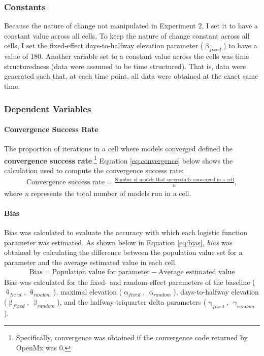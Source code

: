 \documentclass[
12pt, %
twoside,
english]{guelphthesis}
\theoremstyle{definition}
\theoremstyle{definition}
\theoremstyle{definition}
\theoremstyle{definition}
\theoremstyle{remark}
\begin{document}
\hypertarget{constants-1}{%
\subsubsection{Constants}\label{constants-1}}

Because the nature of change not manipulated in Experiment 2, I set it to have a constant value across all cells. To keep the nature of change constant across all cells, I set the fixed-effect days-to-halfway elevation parameter (\(\upbeta_{fixed}\)) to have a value of 180. Another variable set to a constant value across the cells was time structuredness (data were assumed to be time structured). That is, data were generated such that, at each time point, all data were obtained at the exact same time.

\hypertarget{dependent-variables-1}{%
\subsubsection{Dependent Variables}\label{dependent-variables-1}}

\hypertarget{convergence-success-rate}{%
\paragraph{Convergence Success Rate}\label{convergence-success-rate}}

The proportion of iterations in a cell where models converged defined
the \textbf{convergence success rate}.\footnote{Specifically, convergence was obtained if the convergence code returned by OpenMx was 0.} Equation \eqref{eq:convergence} below shows the calculation used to compute the convergence success rate:
\begin{align}
  \text{Convergence success rate} =  \frac{\text{Number of models that successfully converged in a cell}}{n},
  \label{eq:convergence} 
\end{align}
\noindent where \emph{n} represents the total number of models run in a cell.

\hypertarget{bias}{%
\paragraph{Bias}\label{bias}}

Bias was calculated to evaluate the accuracy with which each logistic
function parameter was estimated. As shown below in Equation
\eqref{eq:bias}, \emph{bias} was obtained by calculating the difference
between the population value set for a parameter and the average
estimated value in each cell.
\begin{align}
  \text{Bias} =  \text{Population value for parameter} - \text{Average estimated value}
  \label{eq:bias} 
\end{align}
\noindent Bias was calculated for the fixed- and random-effect parameters of the baseline (\(\uptheta_{fixed}\), \(\uptheta_{random}\)), maximal elevation (\(\upalpha_{fixed}\), \(\upalpha_{random}\)), days-to-halfway elevation (\(\upbeta_{fixed}\), \(\upbeta_{random}\)), and the halfway-triquarter delta parameters (\(\upgamma_{fixed}\), \(\upgamma_{random}\)).
\end{document}
